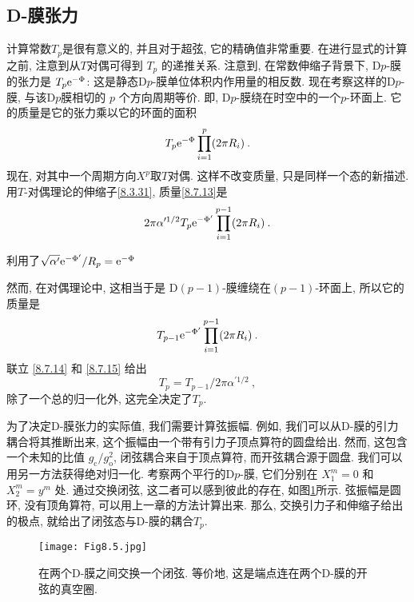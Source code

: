 \subsection*{D-膜张力}
计算常数$T_{p}$是很有意义的, 并且对于超弦, 它的精确值非常重要. 在进行显式的计算之前, 注意到从$T$对偶可得到 $T_{p}$ 的递推关系. 
注意到, 在常数伸缩子背景下, D$p$-膜的张力是 $T_{p} \mathrm{e}^{-\Phi}$: 这是静态D$p$-膜单位体积内作用量的相反数. 
现在考察这样的D$p$-膜, 与该D$p$膜相切的 $p$ 个方向周期等价. 即, D$p$-膜绕在时空中的一个$p$-环面上. 它的质量是它的张力乘以它的环面的面积
\begin{equation}
	T_{p} \mathrm{e}^{-\Phi} \prod_{i=1}^{p}(2 \pi R_{i}) \:. \label{8.7.13}
\end{equation}
现在, 对其中一个周期方向$X^{p}$取$T$对偶. 这样不改变质量, 只是同样一个态的新描述. 用$T$-对偶理论的伸缩子\eqref{8.3.31}, 质量\eqref{8.7.13}是
\begin{equation}
	2 \pi \alpha^{\prime 1/2} T_{p} \mathrm{e}^{-\Phi^{\prime}} \prod_{i=1}^{p-1}(2 \pi R_{i}) \:. \label{8.7.14}
\end{equation}
\begin{tcolorbox}
	\begin{remark}
		利用了$\sqrt{\alpha^\prime}\mathrm{e}^{-\Phi^\prime}/R_p=\mathrm{e}^{-\Phi}$	
	\end{remark}	
\end{tcolorbox}
\noindent 然而, 在对偶理论中, 这相当于是 $\mathrm{D}(p{-}1)$-膜缠绕在$(p{-}1)$-环面上, 所以它的质量是
\begin{equation}
	T_{p-1} \mathrm{e}^{-\Phi^{\prime}} \prod_{i=1}^{p-1}(2 \pi R_{i}) \:. \label{8.7.15}
\end{equation}
联立 \eqref{8.7.14} 和 \eqref{8.7.15} 给出
\begin{equation}
	T_{p}=T_{p-1} / 2 \pi \alpha^{\prime 1/2} \:, \label{8.7.16}
\end{equation}
除了一个总的归一化外, 这完全决定了$T_{p}$.

为了决定D-膜张力的实际值, 我们需要计算弦振幅. 例如, 我们可以从D-膜的引力耦合将其推断出来, 这个振幅由一个带有引力子顶点算符的圆盘给出. 
然而, 这包含一个未知的比值 $g_{\mathrm{c}} / g_{\mathrm{o}}^{2}$, 闭弦耦合来自于顶点算符, 而开弦耦合源于圆盘. 
我们可以用另一方法获得绝对归一化. 考察两个平行的D$p$-膜, 它们分别在 $X_{1}^{m}=0$ 和 $X_{2}^{m}=y^{m}$ 处. 
通过交换闭弦, 这二者可以感到彼此的存在, 如图\ref{Fig8.5}所示. 弦振幅是圆环, 没有顶角算符, 可以用上一章的方法计算出来. 
那么, 交换引力子和伸缩子给出的极点, 就给出了闭弦态与D-膜的耦合$T_{p}$.
\begin{figure}
	\begin{center}
		\texttt{[image: Fig8.5.jpg]}\\
		\caption{在两个D-膜之间交换一个闭弦. 等价地, 这是端点连在两个D-膜的开弦的真空圈.}\label{Fig8.5}
	\end{center}
\end{figure}



